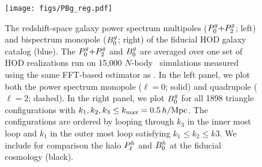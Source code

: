 \begin{figure}
\begin{center}
    \texttt{[image: figs/PBg\_reg.pdf]} 
    \caption{The redshift-space galaxy power spectrum multipoles ($P^g_0{+}P^g_2$; left)
    and bispectrum monopole ($B^g_0$; right) of the fiducial HOD galaxy catalog (blue).
    The $P^g_0{+}P^g_2$ and $B^g_0$ are averaged over one set of HOD realizations run on
    15,000 $N$-body \quij~simulations measured using the same FFT-based estimator as \cite{hahn2020}. In the 
    left panel, we plot both the power spectrum monopole ($\ell = 0$; solid) and quadrupole 
    ($\ell = 2$; dashed). In the right panel, we plot $B^g_0$ for all 1898 triangle
    configurations with $k_1, k_2, k_3 \le k_{\rm max} = 0.5\,h/\mathrm{Mpc}$. The
    configurations are ordered by looping through $k_3$ in the inner most loop
    and $k_1$ in the outer most loop satisfying $k_1 \le k_2 \le k3$.
    We include for comparison the \cite{hahn2020} halo $P^h_{\ell}$ and $B^h_0$ at the 
    fiducial cosmology (black). %
    }
\label{fig:bgh}
\end{center}
\end{figure}

